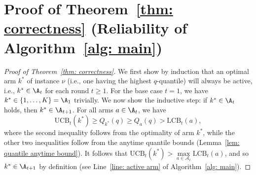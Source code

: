 \section{Proof of Theorem~\ref{thm: correctness} (Reliability of Algorithm~\ref{alg: main})}
\label{sec: appendix correctness}
\begin{proof}[Proof of Theorem~\ref{thm: correctness}]
    We first show by induction that an optimal arm $k^*$ of instance $\nu$ (i.e., one having the highest $ q$-quantile) will always be active, i.e., $k^* \in \A_t$ for each round $t \ge 1$. 
        For the base case $t = 1$, we have $k^* \in \{1, \dots, K\} = \A_1$ trivially. We now show the inductive step: if $k^* \in \A_t$ holds, then $k^* \in \A_{t+1}$. For all arms $a \in \A_t$, we have
    \begin{equation}
        \mathrm{UCB}_t(k^*)
        \ge
        Q_{k^*}(q) 
        \ge Q_{a}(q)  
        > 
        \mathrm{LCB}_t(a),
    \end{equation}
    where the second inequality follows from the optimality of  arm $k^*$,
    while the other two inequalities follow from the anytime quantile bounds (Lemma~\ref{lem: quantile anytime bound}).
    It follows that
    $\mathrm{UCB}_t(k^*) >
            \max\limits_{a \in \mathcal{A}_{t}} \mathrm{LCB}_t(a)$,
    and so $k^* \in \A_{t+1}$ by definition (see Line~\ref{line: active arm} of Algorithm~\ref{alg: main}).



\end{proof}
